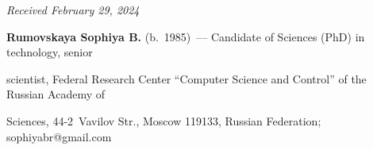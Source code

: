 \vspace*{-6pt}



\hfill{\small\textit{Received February 29, 2024}} 



\vspace*{-12pt} 



\Contrl



\vspace*{-3pt}

   

   \noindent

   \textbf{Rumovskaya Sophiya B.} (b.\ 1985)~--- Candidate of Sciences (PhD) in technology, senior 

scientist, Federal Research Center ``Computer Science and Control'' of the Russian Academy of 

Sciences, 44-2~Vavilov Str., Moscow 119133, Russian Federation; \mbox{sophiyabr@gmail.com}

    

    

 

\label{end\stat}



\renewcommand{\bibname}{\protect\rm Литература} 


